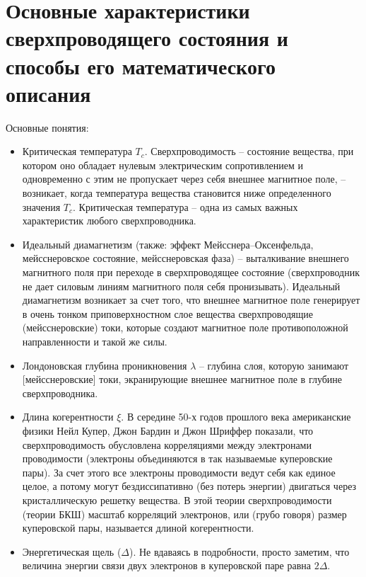 \section{Основные характеристики сверхпроводящего состояния и способы его 
математического описания}

Основные понятия:
\begin{itemize}
    \item Критическая температура \( T_c \). Сверхпроводимость -- состояние 
        вещества, при котором оно обладает нулевым электрическим 
        сопротивлением и одновременно с этим не пропускает через себя внешнее 
        магнитное поле, -- возникает, когда температура вещества становится 
        ниже определенного значения \( T_c \). Критическая температура -- одна 
        из самых важных характеристик любого сверхпроводника.
    \item Идеальный диамагнетизм (также: эффект Мейсснера–Оксенфельда, 
        мейсснеровское состояние, мейсснеровская фаза) -- выталкивание 
        внешнего магнитного поля при переходе в сверхпроводящее состояние 
        (сверхпроводник не дает силовым линиям магнитного поля себя 
        пронизывать). Идеальный диамагнетизм возникает за счет того, что 
        внешнее магнитное поле генерирует в очень тонком приповерхностном 
        слое вещества сверхпроводящие (мейсснеровские) токи, которые создают 
        магнитное поле противоположной направленности и такой же силы.
    \item Лондоновская глубина проникновения \( \lambda \) -- глубина слоя, 
        которую занимают [мейсснеровские] токи, экранирующие внешнее магнитное 
        поле в глубине сверхпроводника.
    \item Длина когерентности \( \xi \). В середине 50-х годов прошлого века 
        американские физики Нейл Купер, Джон Бардин и Джон Шриффер показали, 
        что сверхпроводимость обусловлена корреляциями между электронами 
        проводимости (электроны объединяются в так называемые куперовские 
        пары). За счет этого все электроны проводимости ведут себя как единое 
        целое, а потому могут бездиссипативно (без потерь энергии) двигаться 
        через кристаллическую решетку вещества. В этой теории 
        сверхпроводимости (теории БКШ) масштаб корреляций электронов, или 
        (грубо говоря) размер куперовской пары, называется длиной 
        когерентности.
    \item Энергетическая щель (\( \Delta \)). Не вдаваясь в подробности, 
        просто заметим, что величина энергии связи двух электронов в 
        куперовской паре равна \( 2\Delta \).
\end{itemize}


